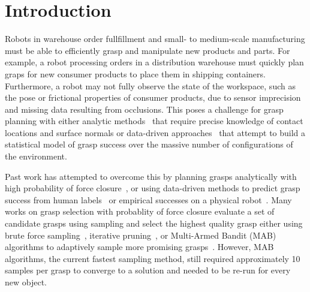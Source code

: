 \section{Introduction}

Robots in warehouse order fullfillment and small- to medium-scale manufacturing must be able to efficiently grasp and manipulate new products and parts.
For example, a robot processing orders in a distribution warehouse must quickly plan graps for new consumer products to place them in shipping containers. 
Furthermore, a robot may not fully observe the state of the workspace, such as the pose or frictional properties of consumer products, due to sensor imprecision and missing data resulting from occlusions.
This poses a challenge for grasp planning with either analytic methods~\cite{ferrari1992, ciocarlie2009} that require precise knowledge of contact locations and surface normals or data-driven approaches~\cite{bohg2014data} that attempt to build a statistical model of grasp success over the massive number of configurations of the environment.

Past work has attempted to overcome this by planning grasps analytically with high probability of force closure~\cite{kehoe2012toward, kim2012physically, laskey2015bandits, mahler2015gp, weisz2012pose}, or using data-driven methods to predict grasp success from human labels~\cite{balasubramanian2012physical, detry2013learning,  herzog2014learning, kappler2015leveraging, lenz2015deep, saxena2008robotic} or empirical successes on a physical robot~\cite{boularias2014efficient, brook2011collaborative, detry2011learning, kroemer2010combining, montesano2012active}.
Many works on grasp selection with probablity of force closure evaluate a set of candidate grasps using sampling and select the highest quality grasp either using brute force sampling~\cite{kehoe2012toward, kim2012physically, weisz2012pose}, iterative pruning~\cite{kehoe2012estimating}, or Multi-Armed Bandit (MAB) algorithms to adaptively sample more promising grasps~\cite{barto1998reinforcement,
lai1985asymptotically, laskey2015bandits, robbins1985some}.
However, MAB algorithms, the current fastest sampling method, still required approximately 10 samples per grasp to converge to a solution and needed to be re-run for every new object.

